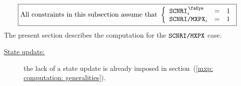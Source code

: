 \[
	\boxed{\text{All constraints in this subsection assume that }
	\left\{ \begin{array}{lcl}
		\isMxpScenario   _{i} & = & 1 \\
		\mxpScenarioMxpx _{i} & = & 1 \\
	\end{array} \right. }
\]
\noindent
The present section describes the computation for the $\texttt{SCNRI}\texttt{/}{\texttt{MXPX}}$ case.
\begin{description}
	\item[\underline{\underline{State update:}}]
		the lack of a state update is already imposed in
		section~(\ref{mxp: computation: generalities}).
\end{description}


